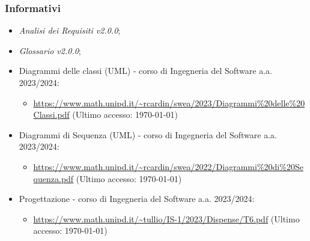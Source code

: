 \documentclass[8pt]{article}
\begin{document}
\subsubsection{Informativi}
\begin{itemize}
    \item \textit{Analisi dei Requisiti v2.0.0};
    \item \textit{Glossario v2.0.0};
    \item Diagrammi delle classi (UML) - corso di Ingegneria del Software a.a. 2023/2024:
    \begin{itemize}
        \item \href{https://www.math.unipd.it/~rcardin/swea/2023/Diagrammi%20delle%20Classi.pdf}{\color{myblue}https://www.math.unipd.it/\textasciitilde{}rcardin/swea/2023/Diagrammi\%20delle\%20Classi.pdf} (Ultimo accesso: \today)
    \end{itemize}
    \item Diagrammi di Sequenza (UML) - corso di Ingegneria del Software a.a. 2023/2024:
    \begin{itemize}
        \item \href{https://www.math.unipd.it/~rcardin/swea/2022/Diagrammi%20di%20Sequenza.pdf}{\color{myblue}https://www.math.unipd.it/\textasciitilde{}rcardin/swea/2022/Diagrammi\%20di\%20Sequenza.pdf} (Ultimo accesso: \today)
    \end{itemize}
    \item Progettazione - corso di Ingegneria del Software a.a. 2023/2024:
    \begin{itemize}
        \item \href{https://www.math.unipd.it/~tullio/IS-1/2023/Dispense/T6.pdf}{\color{myblue}https://www.math.unipd.it/\textasciitilde{}tullio/IS-1/2023/Dispense/T6.pdf} (Ultimo accesso: \today)
    \end{itemize}
\end{itemize}
\end{document}
